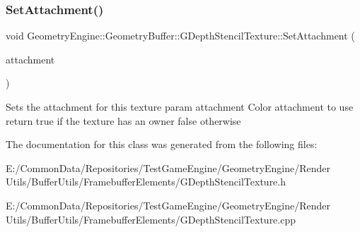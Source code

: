 \subsubsection{\texorpdfstring{SetAttachment()}{SetAttachment()}\hspace{0.1cm}{\footnotesize\ttfamily [2/2]}}
{\footnotesize\ttfamily void Geometry\+Engine\+::\+Geometry\+Buffer\+::\+G\+Depth\+Stencil\+Texture\+::\+Set\+Attachment (\begin{DoxyParamCaption}\item[{G\+Framebuffer\+Commons\+::\+G\+\_\+\+D\+E\+P\+T\+H\+\_\+\+S\+T\+E\+N\+C\+I\+L\+\_\+\+A\+T\+T\+A\+C\+H\+M\+E\+N\+TS}]{attachment }\end{DoxyParamCaption})\hspace{0.3cm}{\ttfamily [virtual]}}

Sets the attachment for this texture param attachment Color attachment to use return true if the texture has an owner false otherwise 

The documentation for this class was generated from the following files\+:\begin{DoxyCompactItemize}
\item 
E\+:/\+Common\+Data/\+Repositories/\+Test\+Game\+Engine/\+Geometry\+Engine/\+Render Utils/\+Buffer\+Utils/\+Framebuffer\+Elements/G\+Depth\+Stencil\+Texture.\+h\item 
E\+:/\+Common\+Data/\+Repositories/\+Test\+Game\+Engine/\+Geometry\+Engine/\+Render Utils/\+Buffer\+Utils/\+Framebuffer\+Elements/G\+Depth\+Stencil\+Texture.\+cpp\end{DoxyCompactItemize}
